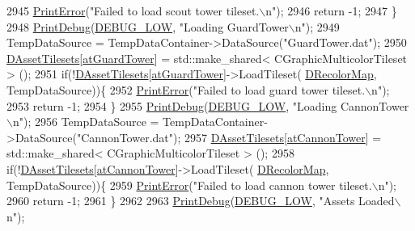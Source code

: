 \begin{DoxyCode}
2945         \hyperlink{Debug_8h_a2ed825eefefe35baf59a93a8c641323d}{PrintError}(\textcolor{stringliteral}{"Failed to load scout tower tileset.\(\backslash\)n"});
2946         \textcolor{keywordflow}{return} -1;
2947     \}
2948     \hyperlink{Debug_8h_aa5f00f5537c9760f6ae1782460748ab9}{PrintDebug}(\hyperlink{Debug_8h_a3a5f3fc09784650d8388cb854882f840}{DEBUG\_LOW}, \textcolor{stringliteral}{"Loading GuardTower\(\backslash\)n"});
2949     TempDataSource = TempDataContainer->DataSource(\textcolor{stringliteral}{"GuardTower.dat"});
2950     \hyperlink{classCApplicationData_a1aaf56a300b30c5e2484a5359366d77a}{DAssetTilesets}[\hyperlink{GameDataTypes_8h_a5600d4fc433b83300308921974477feca65fa6c84ff93972a623793d4ee72d87f}{atGuardTower}] = std::make\_shared< CGraphicMulticolorTileset > 
      ();
2951     \textcolor{keywordflow}{if}(!\hyperlink{classCApplicationData_a1aaf56a300b30c5e2484a5359366d77a}{DAssetTilesets}[\hyperlink{GameDataTypes_8h_a5600d4fc433b83300308921974477feca65fa6c84ff93972a623793d4ee72d87f}{atGuardTower}]->LoadTileset(
      \hyperlink{classCApplicationData_afcbfb5d837afd5c117d91216d1988a53}{DRecolorMap}, TempDataSource))\{
2952         \hyperlink{Debug_8h_a2ed825eefefe35baf59a93a8c641323d}{PrintError}(\textcolor{stringliteral}{"Failed to load guard tower tileset.\(\backslash\)n"});
2953         \textcolor{keywordflow}{return} -1;
2954     \}
2955     \hyperlink{Debug_8h_aa5f00f5537c9760f6ae1782460748ab9}{PrintDebug}(\hyperlink{Debug_8h_a3a5f3fc09784650d8388cb854882f840}{DEBUG\_LOW}, \textcolor{stringliteral}{"Loading CannonTower\(\backslash\)n"});
2956     TempDataSource = TempDataContainer->DataSource(\textcolor{stringliteral}{"CannonTower.dat"});
2957     \hyperlink{classCApplicationData_a1aaf56a300b30c5e2484a5359366d77a}{DAssetTilesets}[\hyperlink{GameDataTypes_8h_a5600d4fc433b83300308921974477feca226f6f1968ce76c97cdabb780a6c289d}{atCannonTower}] = std::make\_shared< CGraphicMulticolorTileset
       > ();
2958     \textcolor{keywordflow}{if}(!\hyperlink{classCApplicationData_a1aaf56a300b30c5e2484a5359366d77a}{DAssetTilesets}[\hyperlink{GameDataTypes_8h_a5600d4fc433b83300308921974477feca226f6f1968ce76c97cdabb780a6c289d}{atCannonTower}]->LoadTileset(
      \hyperlink{classCApplicationData_afcbfb5d837afd5c117d91216d1988a53}{DRecolorMap}, TempDataSource))\{
2959         \hyperlink{Debug_8h_a2ed825eefefe35baf59a93a8c641323d}{PrintError}(\textcolor{stringliteral}{"Failed to load cannon tower tileset.\(\backslash\)n"});
2960         \textcolor{keywordflow}{return} -1;
2961     \}
2962     
2963     \hyperlink{Debug_8h_aa5f00f5537c9760f6ae1782460748ab9}{PrintDebug}(\hyperlink{Debug_8h_a3a5f3fc09784650d8388cb854882f840}{DEBUG\_LOW}, \textcolor{stringliteral}{"Assets Loaded\(\backslash\)n"});

\end{DoxyCode}
